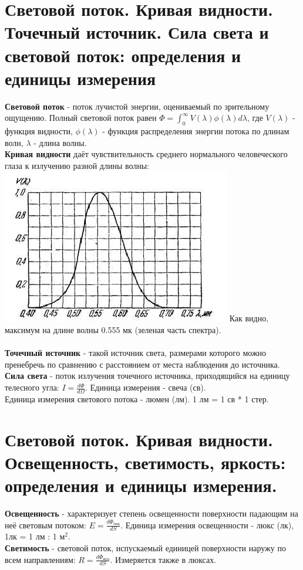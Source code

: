 \documentclass[14pt]{extarticle}
\begin{document}
\section{Световой поток. Кривая видности. Точечный источник.
Сила света и световой поток:
определения и единицы измерения}
\textbf{Световой поток} - поток лучистой энергии, оцениваемый
по зрительному ощущению. Полный световой поток равен 
$\Phi = \int_{0}^{\infty} V(\lambda) \phi(\lambda) d\lambda$,
где $V(\lambda)$ - функция видности, $\phi(\lambda)$ - 
функция распределения энергии потока по длинам волн, 
$\lambda$ - длина волны.\\
\textbf{Кривая видности} даёт чувствительность среднего нормального
человеческого глаза к излучению разной длины волны:
\includegraphics{visibility_curve.png} 
Как видно, максимум на длине волны 0.555 мк (зеленая часть спектра).
\\\\
\textbf{Точечный источник} - такой источник света, размерами
которого можно пренебречь по сравнению с расстоянием от места
наблюдения до источника.\\
\textbf{Сила света} - поток излучения точечного источника, 
приходящийся на единицу телесного угла: 
$I = \frac{d\Phi}{d\Omega}$. Единица измерения - свеча (св).\\
Единица измерения светового потока - люмен (лм).
1 лм = 1 св * 1 стер.
\section{Световой поток. Кривая видности. Освещенность, светимость, яркость: определения и
единицы измерения.}
\textbf{Освещенность} - характеризует степень освещенности 
поверхности падающим на неё световым потоком: 
$E = \frac{d\Phi_{пад}}{dS}$. Единица измерения освещенности - 
люкс (лк), 1лк = 1 лм : 1 м$^2$.\\
\textbf{Светимость} - световой поток, испускаемый единицей 
поверхности наружу по всем направлениям: 
$R = \frac{d\Phi_{исп}}{dS}$. Измеряется также в люксах. 
\end{document}
